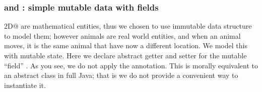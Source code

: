 %

%
%

\subsubsection{\Q@Animal@ and \Q@Horse@: simple mutable data with fields}
\Q@Points2D@ are mathematical entities, thus we chosen to use immutable data structure to model them; however animals are real world entities, and when an animal moves, it is the same animal that have now a different location. We model this with mutable state.
Here we declare abstract getter and setter for the mutable ``field'' \Q@location@.
As you see, we do not apply the \mixin annotation. This is morally equivalent to an abstract class in full Java; that is we do not provide a convenient way to instantiate it.

